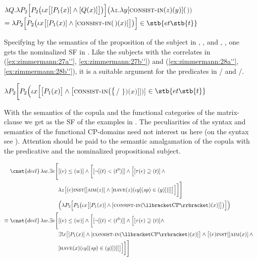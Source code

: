 \documentclass[output=paper]{langscibook}
\begin{document}
\ea\label{ex:zimmermann:29}
\hphantom{=} $\lambda Q . \lambda P_2 \Big[P_2 \big(\iota x \big[[P_1 (x)] \wedge [Q (x) ]\big]\big)\Big] \big(\lambda z . \lambda y [\textsc{consist-in} (z) (y)] ($$)\big)$\\$ = \lambda P_2 \Big[P_2 \big(\iota x \big[[P_1 (x)] \wedge [\textsc{consist-in} ($$) (x)]\big]\big)\Big] \in \stb{et\stb{t}}$
\z

\noindent Specifying  by the semantics of the proposition of the subject in , , and , , one gets the nominalized SF in . Like the subjects with the correlates in (\ref{ex:zimmermann:27a''}, \ref{ex:zimmermann:27b''}) and (\ref{ex:zimmermann:28a''}, \ref{ex:zimmermann:28b''}), it is a suitable argument for the predicates in / and /.

\ea\label{ex:zimmermann:30}
$\lambda P_2 \bigg[P_2 \Big(\iota x \Big[\big[P_1 (x)\big] \wedge \big[\textsc{consist-in}\big( \big\{$/ $\big\}\big) \big(x\big)\big]\Big]\Big)\bigg]$ $\in \stb{et\stb{t}}$
\z

\noindent With the semantics of the copula and the functional categories of the matrix-clause we get  as the SF of the examples in . The peculiarities of the syntax and semantics of the functional CP-domains need not interest us here (on the syntax see ). Attention should be paid to the semantic amalgamation of the copula with the predicative and the nominalized propositional subject.

\begin{equation}\label{ex:zimmermann:31}\begin{aligned}[t]
 \cnst{decl} \, \lambda w . \exists e \Bigg[ & [(e) \leq (w)] \wedge \bigg[[\lnot[(t) < (t^{0})]] \wedge \Big[[\tau(e) \supseteq (t)] \, \wedge\\
             &  \lambda z \big[(e) \textsc{inst} [[\textsc{aim} (z)] \wedge [\textsc{have} (z) (\iota y [(sp) \in (y)])]]\big]\Big]\bigg]\Bigg]\\
             & \Big(\lambda P_2 \Big[P_2 \big(\iota x \big[[P_1 (x)] \wedge [\textsc{consist-in} (\llbracket\text{CP}\rrbracket) (x)]\big]\big)\Big]\Big)\\
 \equiv \cnst{decl} \, \lambda w . \exists e \Bigg[ & [(e) \leq (w)] \wedge \bigg[[\lnot[(t) < (t^{0})]] \wedge \Big[[\tau(e) \supseteq (t)] \wedge \\
              & \exists!x \big[[P_1 (x)] \wedge [\textsc{consist-in} (\llbracket\text{CP}\rrbracket) (x)]\big] \wedge \big[(e) \textsc{inst} [[\textsc{aim} (x)] \, \wedge\\
              & [\textsc{have} (x) (\iota y [(sp) \in (y)])]]\big]\Big]\bigg]\Bigg]\\
\end{aligned}\end{equation}
\end{document}
